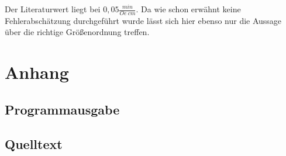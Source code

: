 \documentclass[12pt]{article}
\begin{document}
Der Literaturwert liegt bei $0,05 \frac{min}{Oe~cm}$. Da wie schon erwähnt keine Fehlerabschätzung durchgeführt wurde lässt sich hier ebenso nur die Aussage über die richtige Größenordnung treffen.

\section{Anhang}
\subsection{Programmausgabe}

\subsection{Quelltext}


\end{document}
